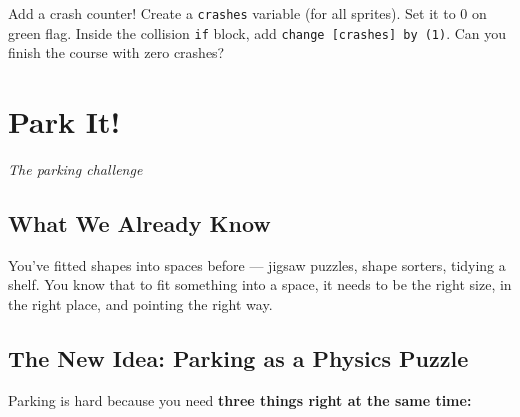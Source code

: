 \documentclass[11pt,a4paper]{article}
\begin{document}
\begin{stretchbox}
Add a crash counter! Create a \texttt{crashes} variable (for all sprites). Set it to 0 on green flag. Inside the collision \texttt{if} block, add \texttt{change [crashes] by (1)}. Can you finish the course with zero crashes?
\end{stretchbox}

\newpage

\section{Park It!}
\textit{\large The parking challenge}

\subsection{What We Already Know}

You've fitted shapes into spaces before --- jigsaw puzzles, shape sorters, tidying a shelf. You know that to fit something into a space, it needs to be the right size, in the right place, and pointing the right way.

\subsection{The New Idea: Parking as a Physics Puzzle}

Parking is hard because you need \textbf{three things right at the same time:}

\begin{center}
\end{center}
\end{document}
